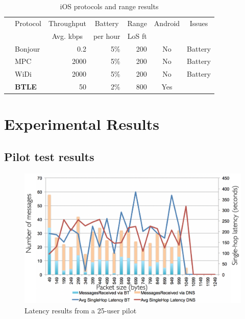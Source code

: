 \documentclass[conference]{IEEEtran}
\begin{document}
\begin{table}[H]
\caption{iOS protocols and range results}
\centering
\begin{tabular}{|c|l|r|r|r|c|l|}
\hline
& \multicolumn{1}{c|}{Protocol} & \multicolumn{1}{c|}{Throughput} & \multicolumn{1}{c|}{Battery} & \multicolumn{1}{c|}{Range} & \multicolumn{1}{c|}{Android} & \multicolumn{1}{c|}{Issues}\\
&                               & \multicolumn{1}{c|}{Avg. kbps}  & \multicolumn{1}{c|}{per hour} & \multicolumn{1}{c|}{LoS ft} &                  &                            \\
\hline
\parbox[t]{2mm}{} & Bonjour & 0.2 & 5\% & 200 & No & Battery\\
& MPC & 2000 & 5\% & 200 & No & Battery\\
& WiDi & 2000 & 5\% & 200 & No & Battery\\
\hline
& \textbf{BTLE} & 50 & 2\% & 800 & Yes & \\
\hline
\end{tabular}
\end{table}

%
\section{Experimental Results}
\label{sec:eval}
%

%

%

%
\subsection{Pilot test results}
\label{sec:romania}
%
\begin{figure}[htbp]
\centerline{\includegraphics[width=\columnwidth]{figs/romania_latency}}
\caption{Latency results from a 25-user pilot}
\label{fig:romania_lat}
\end{figure}
\end{document}

